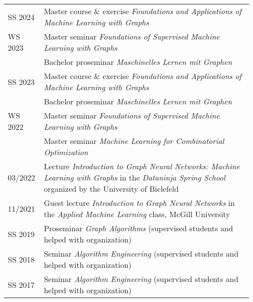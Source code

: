 \documentclass[11pt, a4paper, DIV=14, headings=small]{scrartcl}
\begin{document}
	\begin{longtabu}{p{2.1cm}p{12.0cm}}
		SS 2024    & Master course \& exercise \emph{Foundations and Applications of Machine Learning with Graphs}                                                                                   \\
		WS 2023    & Master seminar \emph{Foundations of Supervised Machine Learning with Graphs}          \\    
			       & Bachelor proseminar \emph{Maschinelles Lernen mit Graphen}                                                                                                               \\
		SS 2023    & Master course \& exercise \emph{Foundations and Applications of Machine Learning with Graphs}                                                                                   \\
		& Bachelor proseminar \emph{Maschinelles Lernen mit Graphen}                                                                                                                      \\
		WS 2022    & Master seminar \emph{Foundations of Supervised Machine Learning with Graphs}                                                                                                    \\
		& Master seminar \emph{Machine Learning for Combinatorial Optimization}                                                                                                           \\
		03/2022    & Lecture \emph{Introduction to Graph Neural Networks: Machine Learning with Graphs} in the \emph{Dataninja Spring School} organized by the University of Bielefeld               \\
		11/2021    & Guest lecture \emph{Introduction to Graph Neural Networks} in the \emph{Applied Machine Learning} class, McGill University                                                      \\
		SS 2019    & Proseminar \emph{Graph Algorithms} (supervised students and helped with organization)                                                                                           \\
		SS 2018    & Seminar \emph{Algorithm Engineering} (supervised students and helped with organization)                                                                                         \\
		SS 2017    & Seminar \emph{Algorithm Engineering} (supervised students and helped with organization)                                                                                         \\

\end{longtabu}
\end{document}
